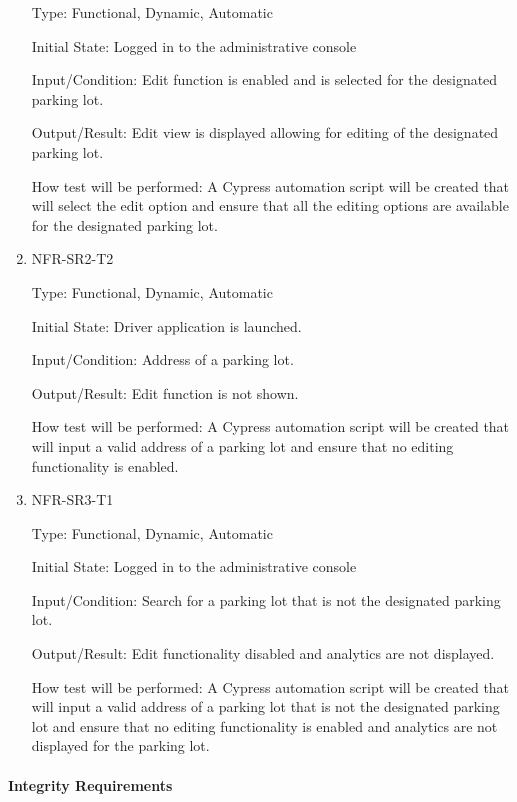\documentclass[12pt, titlepage]{article}
\begin{document}
\begin{enumerate}
Type: Functional, Dynamic, Automatic
					
Initial State: Logged in to the administrative console 
					
Input/Condition: Edit function is enabled and is selected for the designated
parking lot.
					
Output/Result: Edit view is displayed allowing for editing of the designated
parking lot.
					
How test will be performed: A Cypress automation script will be created that
will select the edit option and ensure that all the editing options are
available for the designated parking lot.

\item{NFR-SR2-T2}

Type: Functional, Dynamic, Automatic
					
Initial State: Driver application is launched.
					
Input/Condition: Address of a parking lot.
					
Output/Result: Edit function is not shown.
					
How test will be performed: A Cypress automation script will be created that
will input a valid address of a parking lot and ensure that no editing
functionality is enabled.

\item{NFR-SR3-T1}

Type: Functional, Dynamic, Automatic
					
Initial State: Logged in to the administrative console 
					
Input/Condition: Search for a parking lot that is not the designated parking
lot.
					
Output/Result: Edit functionality disabled and analytics are not displayed.

How test will be performed: A Cypress automation script will be created that
will input a valid address of a parking lot that is not the designated parking
lot and ensure that no editing functionality is enabled and analytics are not
displayed for the parking lot.

\end{enumerate}

\paragraph{Integrity Requirements}
\end{document}
